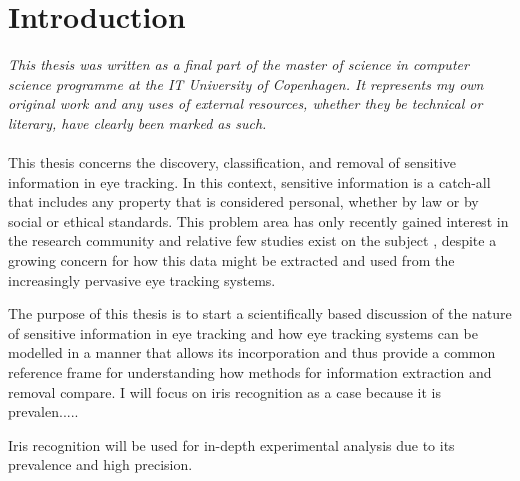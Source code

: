 \chapter{Introduction}
\emph{This thesis was written as a final part of the master of science in computer science programme at the IT University of Copenhagen. It represents my own original work and any uses of external resources, whether they be technical or literary, have clearly been marked as such.}
\\
\\
\noindent This thesis concerns the discovery, classification, and removal of sensitive information in eye tracking. In this context, sensitive information is a catch-all that includes any property that is considered personal, whether by law or by social or ethical standards. This problem area has only recently gained interest in the research community and relative few studies exist on the subject \parencite{BRENDAN_ARTICLE, BRENDAN_SNOW, differential-general, differential-general-two, privaceye}, despite a growing concern for how this data might be extracted and used from the increasingly pervasive eye tracking systems. 

The purpose of this thesis is to start a scientifically based discussion of the nature of sensitive information in eye tracking and how eye tracking systems can be modelled in a manner that allows its incorporation and thus provide a common reference frame for understanding how methods for information extraction and removal compare. I will focus on iris recognition as a case because it is prevalen.....

Iris recognition will be used for in-depth experimental analysis due to its prevalence and high precision. 







